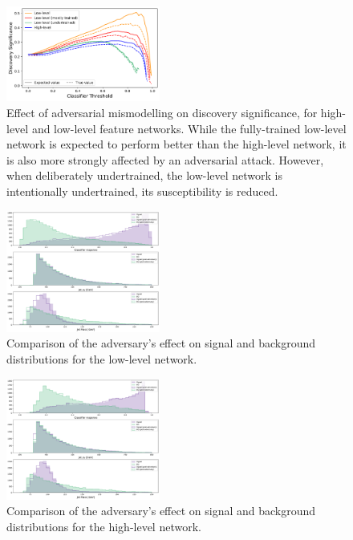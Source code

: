 \documentclass[reprint,nofootinbib,...]{revtex4-1}
\begin{document}
\begin{figure}[h!]
\centering
\includegraphics[width=0.45\textwidth]{figures/adversary_significance.pdf}
\caption{Effect of adversarial mismodelling on discovery significance, for high-level and low-level feature networks.
While the fully-trained low-level network is expected to perform better than the high-level network, it is also more strongly affected by an adversarial attack.
However, when deliberately undertrained, the low-level network is intentionally undertrained, its susceptibility is reduced.
}
\label{fig:method2b}
\end{figure}

\begin{figure}[h!]
\centering
\includegraphics[width=0.45\textwidth]{figures/adv_classifer_response.pdf}
\caption{
Comparison of the adversary's effect on signal and background distributions for the low-level network.
}
\end{figure}

\begin{figure}[h!]
\centering
\includegraphics[width=0.45\textwidth]{figures/adv_classifer_response_HL.pdf}
\caption{
Comparison of the adversary's effect on signal and background distributions for the high-level network.
}
\end{figure}
\end{document}
